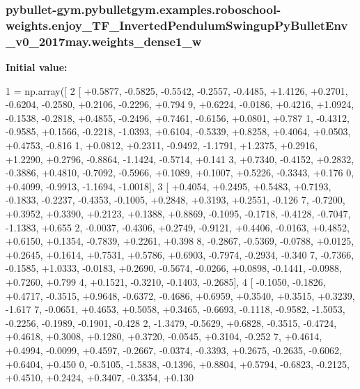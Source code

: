 \subsubsection[{\texorpdfstring{weights\+\_\+dense1\+\_\+w}{weights_dense1_w}}]{\setlength{\rightskip}{0pt plus 5cm}pybullet-\/gym.\+pybulletgym.\+examples.\+roboschool-\/weights.\+enjoy\+\_\+\+T\+F\+\_\+\+Inverted\+Pendulum\+Swingup\+Py\+Bullet\+Env\+\_\+v0\+\_\+2017may.\+weights\+\_\+dense1\+\_\+w}\hypertarget{namespacepybullet-gym_1_1pybulletgym_1_1examples_1_1roboschool-weights_1_1enjoy___t_f___inverted49df41add915758d6f92d022ad22e9f0_a740e311dc93211b876f8429c3e621d6d}{}\label{namespacepybullet-gym_1_1pybulletgym_1_1examples_1_1roboschool-weights_1_1enjoy___t_f___inverted49df41add915758d6f92d022ad22e9f0_a740e311dc93211b876f8429c3e621d6d}
{\bfseries Initial value\+:}
\begin{DoxyCode}
1 = np.array([
2 [ +0.5877, -0.5825, -0.5542, -0.2557, -0.4485, +1.4126, +0.2701, -0.6204, -0.2580, +0.2106, -0.2296, +0.794
      9, +0.6224, -0.0186, +0.4216, +1.0924, -0.1538, -0.2818, +0.4855, -0.2496, +0.7461, -0.6156, +0.0801, +0.787
      1, -0.4312, -0.9585, +0.1566, -0.2218, -1.0393, +0.6104, -0.5339, +0.8258, +0.4064, +0.0503, +0.4753, -0.816
      1, +0.0812, +0.2311, -0.9492, -1.1791, +1.2375, +0.2916, +1.2290, +0.2796, -0.8864, -1.1424, -0.5714, +0.141
      3, +0.7340, -0.4152, +0.2832, -0.3886, +0.4810, -0.7092, -0.5966, +0.1089, +0.1007, +0.5226, -0.3343, +0.176
      0, +0.4099, -0.9913, -1.1694, -1.0018],
3 [ +0.4054, +0.2495, +0.5483, +0.7193, -0.1833, -0.2237, -0.4353, -0.1005, +0.2848, +0.3193, +0.2551, -0.126
      7, -0.7200, +0.3952, +0.3390, +0.2123, +0.1388, +0.8869, -0.1095, -0.1718, -0.4128, -0.7047, -1.1383, +0.655
      2, -0.0037, -0.4306, +0.2749, -0.9121, +0.4406, -0.0163, +0.4852, +0.6150, +0.1354, -0.7839, +0.2261, +0.398
      8, -0.2867, -0.5369, -0.0788, +0.0125, +0.2645, +0.1614, +0.7531, +0.5786, +0.6903, -0.7974, -0.2934, -0.340
      7, -0.7366, -0.1585, +1.0333, -0.0183, +0.2690, -0.5674, -0.0266, +0.0898, -0.1441, -0.0988, +0.7260, +0.799
      4, +0.1521, -0.3210, -0.1403, -0.2685],
4 [ -0.1050, -0.1826, +0.4717, -0.3515, +0.9648, -0.6372, -0.4686, +0.6959, +0.3540, +0.3515, +0.3239, -1.617
      7, -0.0651, +0.4653, +0.5058, +0.3465, -0.6693, -0.1118, -0.9582, -1.5053, -0.2256, -0.1989, -0.1901, -0.428
      2, -1.3479, -0.5629, +0.6828, -0.3515, -0.4724, +0.4618, +0.3008, +0.1280, +0.3720, -0.0545, +0.3104, -0.252
      7, +0.4614, +0.4994, -0.0099, +0.4597, -0.2667, -0.0374, -0.3393, +0.2675, -0.2635, -0.6062, +0.6404, +0.450
      0, -0.5105, -1.5838, -0.1396, +0.8804, +0.5794, -0.6823, -0.2125, +0.4510, +0.2424, +0.3407, -0.3354, +0.130

\end{DoxyCode}

